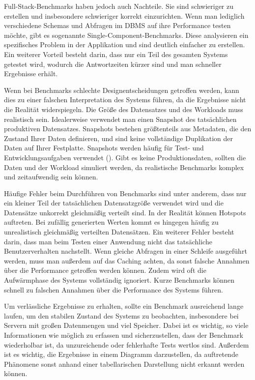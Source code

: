 Full-Stack-Benchmarks haben jedoch auch Nachteile.
Sie sind schwieriger zu erstellen und insbesondere schwieriger korrekt einzurichten.
Wenn man lediglich verschiedene Schemas und Abfragen im DBMS auf ihre Performance testen möchte, gibt es sogenannte Single-Component-Benchmarks.
Diese analysieren ein spezifisches Problem in der Applikation und sind deutlich einfacher zu erstellen.
Ein weiterer Vorteil besteht darin, dass nur ein Teil des gesamten Systems getestet wird, wodurch die Antwortzeiten
kürzer sind und man schneller Ergebnisse erhält.

Wenn bei Benchmarks schlechte Designentscheidungen getroffen werden, kann dies zu einer falschen Interpretation des Systems führen, da die Ergebnisse nicht die Realität widerspiegeln.
Die Größe des Datensatzes und des Workloads muss realistisch sein.
Idealerweise verwendet man einen Snapshot des tatsächlichen produktiven Datensatzes.
Snapshots bestehen größtenteils aus Metadaten, die den Zustand Ihrer Daten definieren, und sind keine vollständige Duplikation der Daten auf Ihrer Festplatte.
Snapshots werden häufig für Test- und Entwicklungsaufgaben verwendet (\cite{snapshot}).
Gibt es keine Produktionsdaten, sollten die Daten und der Workload simuliert werden, da realistische Benchmarks komplex und zeitaufwendig sein können.

Häufige Fehler beim Durchführen von Benchmarks sind unter anderem, dass nur ein kleiner Teil der tatsächlichen Datensatzgröße verwendet wird und die Datensätze unkorrekt gleichmäßig verteilt sind.
In der Realität können Hotspots auftreten.
Bei zufällig generierten Werten kommt es hingegen häufig zu unrealistisch gleichmäßig verteilten Datensätzen.
Ein weiterer Fehler besteht darin, dass man beim Testen einer Anwendung nicht das tatsächliche Benutzerverhalten nachstellt.
Wenn gleiche Abfragen in einer Schleife ausgeführt werden, muss man außerdem auf das Caching achten, da sonst falsche Annahmen über die Performance getroffen werden können.
Zudem wird oft die Aufwärmphase des Systems vollständig ignoriert.
Kurze Benchmarks können schnell zu falschen Annahmen über die Performance des Systems führen.

Um verlässliche Ergebnisse zu erhalten, sollte ein Benchmark ausreichend lange laufen, um den stabilen Zustand des Systems zu beobachten, insbesondere bei Servern mit großen Datenmengen und viel Speicher.
Dabei ist es wichtig, so viele Informationen wie möglich zu erfassen und sicherzustellen, dass der Benchmark wiederholbar ist, da unzureichende oder fehlerhafte Tests wertlos sind.
Außerdem ist es wichtig, die Ergebnisse in einem Diagramm darzustellen, da auftretende Phänomene sonst anhand einer tabellarischen Darstellung nicht erkannt werden können.


